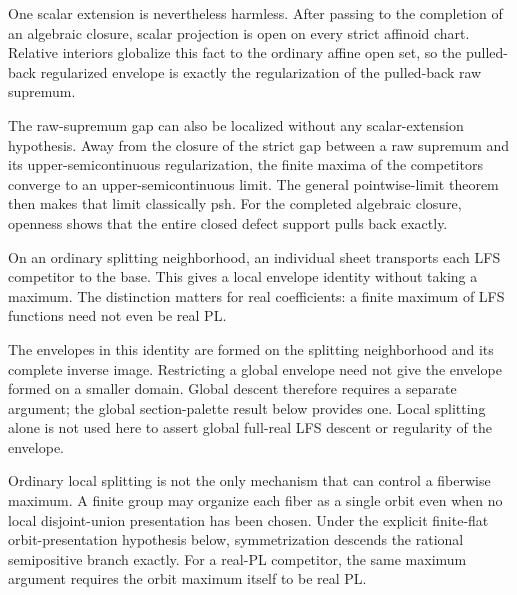 


One scalar extension is nevertheless harmless.  After passing to the
completion of an algebraic closure, scalar projection is open on every
strict affinoid chart.  Relative interiors globalize this fact to the
ordinary affine open set, so the pulled-back regularized envelope is
exactly the regularization of the pulled-back raw supremum.




The raw-supremum gap can also be localized without any scalar-extension
hypothesis.  Away from the closure of the strict gap between a raw
supremum and its upper-semicontinuous regularization, the finite maxima of
the competitors converge to an upper-semicontinuous limit.  The general
pointwise-limit theorem then makes that limit classically psh.  For the
completed algebraic closure, openness shows that the entire closed defect
support pulls back exactly.




On an ordinary splitting neighborhood, an individual sheet transports each
LFS competitor to the base. This gives a local envelope identity without
taking a maximum. The distinction matters for real coefficients: a finite
maximum of LFS functions need not even be real PL.




The envelopes in this identity are formed on the splitting neighborhood
and its complete inverse image. Restricting a global envelope need not give
the envelope formed on a smaller domain. Global descent therefore requires
a separate argument; the global section-palette result below provides one.
Local splitting alone is not used here to assert global full-real LFS
descent or regularity of the envelope.

Ordinary local splitting is not the only mechanism that can control a
fiberwise maximum.  A finite group may organize each fiber as a single
orbit even when no local disjoint-union presentation has been chosen.  Under
the explicit finite-flat orbit-presentation hypothesis below, symmetrization
descends the rational semipositive branch exactly. For a real-PL
competitor, the same maximum argument requires the orbit maximum itself to
be real PL.

